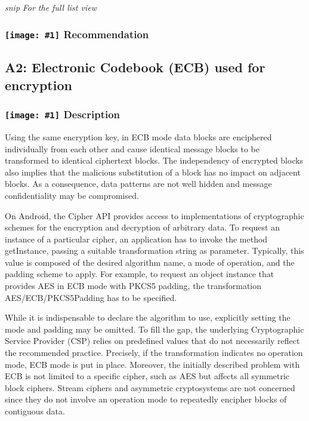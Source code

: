 \documentclass[12p]{article}
\newcommand{\icon}[1]{\texttt{[image: \#1]}}
\begin{document}
\textit{snip}
\newline \textsl{For the full list view }
\subsubsection*{\protect\icon{/home/miki/Documents/GITHUB/AndroidPermissions/python/vulns/report_icons/basic_todo.png} Recommendation}

\subsection{A2: Electronic Codebook (ECB) used for encryption}
\subsubsection*{\protect\icon{/home/miki/Documents/GITHUB/AndroidPermissions/python/vulns/report_icons/basic_sheet.png} Description}

            Using the same encryption key, in ECB mode data blocks are enciphered individually 
            from each other and cause identical message blocks to be transformed to identical ciphertext 
            blocks. The independency of encrypted blocks also implies that the malicious substitution of a 
            block has no impact on adjacent blocks. As a consequence, data patterns are not well hidden and 
            message confidentiality may be compromised.
            
            On Android, the Cipher API provides access to implementations of cryptographic schemes
            for the encryption and decryption of arbitrary data. To request an instance of a particular cipher,
            an application has to invoke the method getInstance, passing a suitable transformation string as
            parameter. Typically, this value is composed of the desired algorithm name, a mode of operation,
            and the padding scheme to apply. For example, to request an object instance that provides AES in
            ECB mode with PKCS5 padding, the transformation AES/ECB/PKCS5Padding has to be specified.
            
            While it is indispensable to declare the algorithm to use, explicitly setting the mode and
            padding may be omitted. To fill the gap, the underlying Cryptographic Service Provider (CSP)
            relies on predefined values that do not necessarily reflect the recommended practice. Precisely, if
            the transformation indicates no operation mode, ECB mode is put in place. Moreover, the initially
            described problem with ECB is not limited to a specific cipher, such as AES but affects all symmetric
            block ciphers. Stream ciphers and asymmetric cryptosystems are not concerned since they
            do not involve an operation mode to repeatedly encipher blocks of contiguous data.
        
\end{document}
